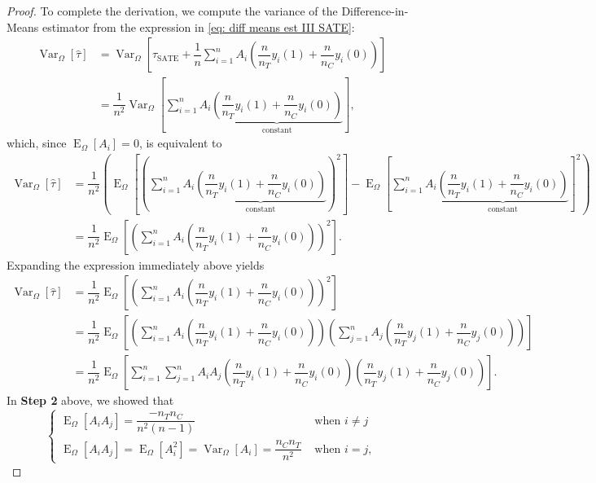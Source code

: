 \documentclass[12pt,leqno]{article}
\theoremstyle{newstyle}
\DeclareMathOperator{\E}{\mathrm{E}}
\DeclareMathOperator{\Var}{\mathrm{Var}}
\newcommand{\bZ}{\bm{Z}}   \newcommand{\bz}{\bm{z}}   %
\newcommand{\EZ}{\E_{\Omega}}    \newcommand{\VarZ}{\Var_{\Omega}}  %
\newcommand{\po}[2]{y_{#1}(#2)}     %
\newcommand{\tauS}{\tau_{\text{SATE}}}
\newcommand{\tauhat}{\hat{\tau}}
\begin{document}
\begin{proof}
To complete the derivation, we compute the variance of the Difference-in-Means estimator from the expression in \eqref{eq: diff means est III SATE}:
\small
\begin{align*}
\VarZ\left[\tauhat\right] & = \VarZ\left[\tauS + \dfrac{1}{n} \sum \limits_{i = 1}^n A_i \left(\dfrac{n}{n_T} \po{i}{1} + \dfrac{n}{n_C} \po{i}{0}\right)\right] \\[1ex]
& = \dfrac{1}{n^2}\VarZ\left[\sum \limits_{i = 1}^n A_i \underbrace{\left(\dfrac{n}{n_T} \po{i}{1} + \dfrac{n}{n_C} \po{i}{0}\right)}_{\text{constant}}\right],
\end{align*}
\normalsize
which, since $\EZ[A_i] = 0$, is equivalent to
\small
\begin{align*}
\VarZ\left[\tauhat\right] & = \dfrac{1}{n^2} \left(\EZ\left[\left(\sum \limits_{i = 1}^n A_i \underbrace{\left(\dfrac{n}{n_T} \po{i}{1} + \dfrac{n}{n_C} \po{i}{0}\right)}_{\text{constant}}\right)^2\right] - \EZ\left[\sum \limits_{i = 1}^n A_i \underbrace{\left(\dfrac{n}{n_T} \po{i}{1} + \dfrac{n}{n_C} \po{i}{0}\right)}_{\text{constant}}\right]^2\right) \\[1ex]
& = \dfrac{1}{n^2} \EZ\left[\left(\sum \limits_{i = 1}^n A_i \left(\dfrac{n}{n_T} \po{i}{1} + \dfrac{n}{n_C} \po{i}{0}\right)\right)^2\right].
\end{align*}
\normalsize
Expanding the expression immediately above yields
\small
\begin{align*}
\VarZ\left[\tauhat\right] & = \dfrac{1}{n^2} \EZ\left[\left(\sum \limits_{i = 1}^n A_i \left(\dfrac{n}{n_T} \po{i}{1} + \dfrac{n}{n_C} \po{i}{0}\right)\right)^2\right] \\[1ex]
& = \dfrac{1}{n^2} \EZ\left[\left(\sum \limits_{i = 1}^n A_i \left(\dfrac{n}{n_T} \po{i}{1} + \dfrac{n}{n_C} \po{i}{0}\right)\right) \left(\sum \limits_{j = 1}^n A_j \left(\dfrac{n}{n_T} \po{j}{1} + \dfrac{n}{n_C} \po{j}{0}\right)\right)\right] \\[1ex]
& = \dfrac{1}{n^2} \EZ\left[\sum \limits_{i = 1}^n \sum \limits_{j = 1}^n A_i A_j\left(\dfrac{n}{n_T} \po{i}{1} + \dfrac{n}{n_C} \po{i}{0}\right)\left(\dfrac{n}{n_T} \po{j}{1} + \dfrac{n}{n_C} \po{j}{0}\right)\right].
\end{align*}
\normalsize
In \textbf{Step 2} above, we showed that 
\small
\begin{equation*}
\begin{cases}
\EZ\left[A_iA_j\right] = \dfrac{-n_T n_C}{n^2\left(n - 1\right)} & \text{ when } i \neq j \\[1ex]
\EZ\left[A_iA_j\right] = \EZ\left[A_i^2\right] = \VarZ\left[A_i\right] = \dfrac{n_C n_T}{n^2} & \text{ when } i = j, 

\end{cases}
\end{equation*}
\end{proof}
\end{document}

